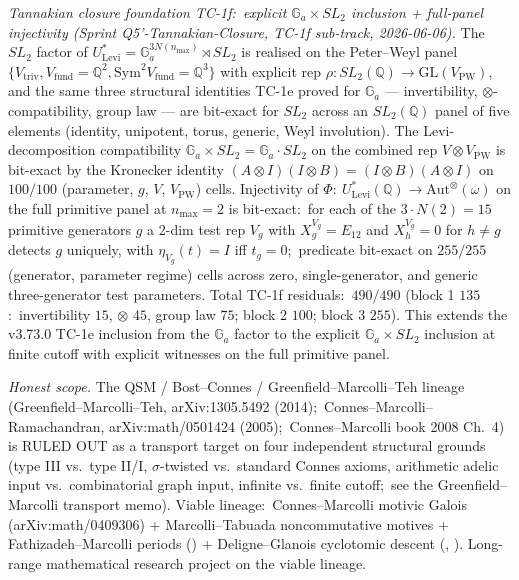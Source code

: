 \documentclass[11pt,a4paper]{article}
\theoremstyle{plain}
\theoremstyle{definition}
\begin{document}
\emph{Tannakian closure foundation TC-1f:\ explicit $\mathbb{G}_a
\times SL_2$ inclusion + full-panel injectivity (Sprint
Q5'-Tannakian-Closure, TC-1f sub-track, 2026-06-06).}
The $SL_2$ factor of $U^*_{\mathrm{Levi}} = \mathbb{G}_a^{3 N(n_{\max})}
\rtimes SL_2$ is realised on the Peter--Weyl panel
$\{V_{\mathrm{triv}}, V_{\mathrm{fund}} = \mathbb{Q}^2, \mathrm{Sym}^2
V_{\mathrm{fund}} = \mathbb{Q}^3\}$ with explicit rep
$\rho: SL_2(\mathbb{Q}) \to \mathrm{GL}(V_{\mathrm{PW}})$, and the same
three structural identities TC-1e proved for $\mathbb{G}_a$ ---
invertibility, $\otimes$-compatibility, group law --- are bit-exact for
$SL_2$ across an $SL_2(\mathbb{Q})$ panel of five elements (identity,
unipotent, torus, generic, Weyl involution).  The Levi-decomposition
compatibility $\mathbb{G}_a \times SL_2 = \mathbb{G}_a \cdot SL_2$ on
the combined rep $V \otimes V_{\mathrm{PW}}$ is bit-exact by the
Kronecker identity $(A \otimes I)(I \otimes B) = (I \otimes B)(A
\otimes I)$ on $100 / 100$ (parameter, $g$, $V$, $V_{\mathrm{PW}}$)
cells.  Injectivity of $\Phi:\ U^*_{\mathrm{Levi}}(\mathbb{Q}) \to
\mathrm{Aut}^\otimes(\omega)$ on the full primitive panel at
$n_{\max} = 2$ is bit-exact:\ for each of the $3 \cdot N(2) = 15$
primitive generators $g$ a 2-dim test rep $V_g$ with
$X_g^{V_g} = E_{12}$ and $X_h^{V_g} = 0$ for $h \ne g$ detects $g$
uniquely, with $\eta_{V_g}(t) = I$ iff $t_g = 0$;\ predicate bit-exact
on $255 / 255$ (generator, parameter regime) cells across zero,
single-generator, and generic three-generator test parameters.  Total
TC-1f residuals:\ $490 / 490$ (block 1 $135$:\ invertibility $15$,
$\otimes$ $45$, group law $75$; block 2 $100$; block 3 $255$).  This
extends the v3.73.0 TC-1e inclusion from the $\mathbb{G}_a$ factor to
the explicit $\mathbb{G}_a \times SL_2$ inclusion at finite cutoff with
explicit witnesses on the full primitive panel.

\emph{Honest scope.}  The QSM / Bost--Connes / Greenfield--Marcolli--Teh
lineage (Greenfield--Marcolli--Teh, arXiv:1305.5492 (2014);\
Connes--Marcolli--Ramachandran, arXiv:math/0501424 (2005);\
Connes--Marcolli book 2008 Ch.~4) is RULED OUT as a transport target
on four independent structural grounds (type III vs.\ type II/I,
$\sigma$-twisted vs.\ standard Connes axioms, arithmetic adelic input
vs.\ combinatorial graph input, infinite vs.\ finite cutoff;\ see
the Greenfield--Marcolli transport memo).  Viable lineage:\
Connes--Marcolli motivic Galois (arXiv:math/0409306) + Marcolli--Tabuada
noncommutative motives + Fathizadeh--Marcolli periods
(\cite{fathizadeh_marcolli2016}) + Deligne--Glanois cyclotomic
descent (\cite{deligne2010}, \cite{glanois2015}).  Long-range
mathematical research project on the viable lineage.
\end{document}
